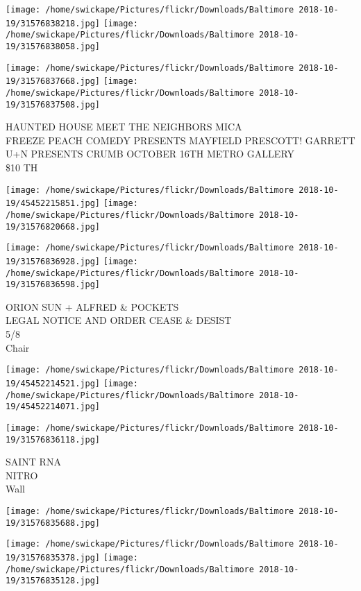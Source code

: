 \documentclass[10pt,letterpaper]{article}
\begin{document}
\texttt{[image: /home/swickape/Pictures/flickr/Downloads/Baltimore 2018-10-19/31576838218.jpg]}
\texttt{[image: /home/swickape/Pictures/flickr/Downloads/Baltimore 2018-10-19/31576838058.jpg]}

\texttt{[image: /home/swickape/Pictures/flickr/Downloads/Baltimore 2018-10-19/31576837668.jpg]}
\texttt{[image: /home/swickape/Pictures/flickr/Downloads/Baltimore 2018-10-19/31576837508.jpg]}

HAUNTED HOUSE MEET THE NEIGHBORS MICA\\
FREEZE PEACH COMEDY PRESENTS MAYFIELD PRESCOTT!  GARRETT\\
U+N PRESENTS CRUMB OCTOBER 16TH METRO GALLERY\\
\$10 TH\\
\pagebreak

\texttt{[image: /home/swickape/Pictures/flickr/Downloads/Baltimore 2018-10-19/45452215851.jpg]}
\texttt{[image: /home/swickape/Pictures/flickr/Downloads/Baltimore 2018-10-19/31576820668.jpg]}

\texttt{[image: /home/swickape/Pictures/flickr/Downloads/Baltimore 2018-10-19/31576836928.jpg]}
\texttt{[image: /home/swickape/Pictures/flickr/Downloads/Baltimore 2018-10-19/31576836598.jpg]}

ORION SUN + ALFRED \& POCKETS\\
LEGAL NOTICE AND ORDER CEASE \& DESIST\\
5/8\\
Chair\\
\pagebreak

\texttt{[image: /home/swickape/Pictures/flickr/Downloads/Baltimore 2018-10-19/45452214521.jpg]}
\texttt{[image: /home/swickape/Pictures/flickr/Downloads/Baltimore 2018-10-19/45452214071.jpg]}

\vspace{0.25in}
\texttt{[image: /home/swickape/Pictures/flickr/Downloads/Baltimore 2018-10-19/31576836118.jpg]}

SAINT RNA\\
NITRO\\
Wall\\
\pagebreak

\texttt{[image: /home/swickape/Pictures/flickr/Downloads/Baltimore 2018-10-19/31576835688.jpg]}

\vspace{0.25in}
\texttt{[image: /home/swickape/Pictures/flickr/Downloads/Baltimore 2018-10-19/31576835378.jpg]}
\texttt{[image: /home/swickape/Pictures/flickr/Downloads/Baltimore 2018-10-19/31576835128.jpg]}
\end{document}
